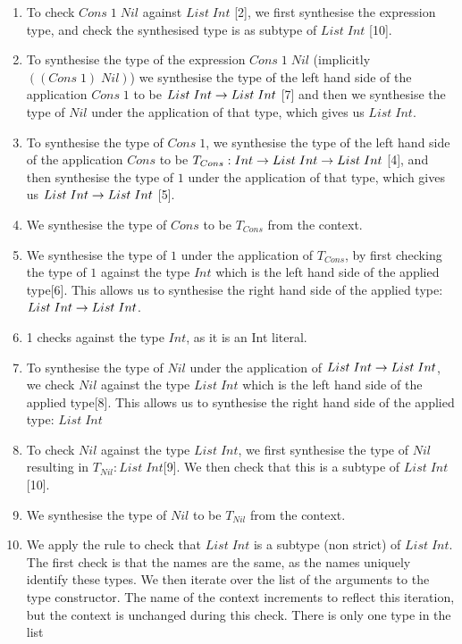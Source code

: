 \begin{enumerate}
    \item To check $Cons\;1\;Nil$ against $List\;Int$ [2], we first synthesise the expression type, and check the synthesised type is as subtype of $List\;Int$ [10].
    \item To synthesise the type of the expression $Cons\;1\;Nil$ (implicitly $((Cons\;1)\;Nil)$) we synthesise the type of the left hand side of the application $Cons\;1$ to be $List\;Int\rightarrow List\;Int$ [7] and then we synthesise the type of $Nil$ under the application of that type, which gives us $List\;Int$.
    \item To synthesise the type of $Cons\;1$, we synthesise the type of the left hand side of the application $Cons$ to be $T_{Cons}: Int\rightarrow List\;Int\rightarrow List\;Int$ [4], and then synthesise the type of $1$ under the application of that type, which gives us $List\;Int\rightarrow List\;Int$ [5].
    \item We synthesise the type of $Cons$ to be $T_{Cons}$ from the context.
    \item We synthesise the type of $1$ under the application of $T_{Cons}$, by first checking the type of $1$ against the type $Int$ which is the left hand side of the applied type[6]. This allows us to synthesise the right hand side of the applied type: $List\;Int\rightarrow List\;Int$. 
    \item 1 checks against the type $Int$, as it is an Int literal.
    \item To synthesise the type of $Nil$ under the application of $List\;Int\rightarrow List\;Int$, we check $Nil$ against the type $List\;Int$ which is the left hand side of the applied type[8]. This allows us to synthesise the right hand side of the applied type: $List\;Int$
    \item To check $Nil$ against the type $List\;Int$, we first synthesise the type of $Nil$ resulting in $T_{Nil} :List\;Int$[9]. We then check that this is a subtype of $List\;Int$[10].
    \item We synthesise the type of $Nil$ to be $T_{Nil}$ from the context.
    \item We apply the \MyTCRule{\Unionsubrulename} rule to check that $List\;Int$ is a subtype (non strict) of $List\;Int$. The first check is that the names are the same, as the names uniquely identify these types. We then iterate over the list of the arguments to the type constructor. The name of the context increments to reflect this iteration, but the context is unchanged during this check. There is only one type in the list
\end{enumerate}